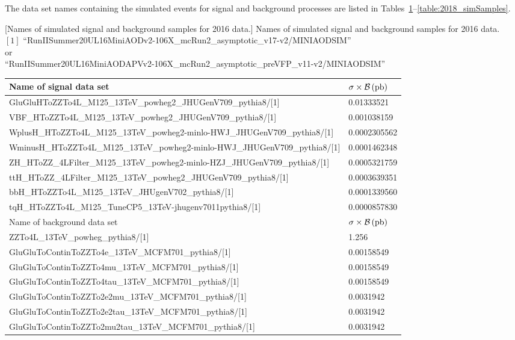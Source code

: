 The data set names containing the simulated events for signal and background processes are listed in Tables~\ref{table:2016_simSamples}--\ref{table:2018_simSamples}.
\begin{table}[h]
    \small
        [Names of simulated signal and background samples for 2016 data.]
        {Names of simulated signal and background samples for 2016 data. \\
        $[1]$ ``RunIISummer20UL16MiniAODv2-106X\_mcRun2\_asymptotic\_v17-v2/MINIAODSIM''
        \\
        or
        \\
        ``RunIISummer20UL16MiniAODAPVv2-106X\_mcRun2\_asymptotic\_preVFP\_v11-v2/MINIAODSIM''}
	\begin{tabular}{|ll|}
		\hline      
        Name of signal data set & $\sigma \times \mathcal{B}\,(\text{pb})$ \\
        \hline
		GluGluHToZZTo4L\_M125\_13TeV\_powheg2\_JHUGenV709\_pythia8/[1]	&	0.01333521	\\
		VBF\_HToZZTo4L\_M125\_13TeV\_powheg2\_JHUGenV709\_pythia8/[1]	&	0.001038159	\\
		WplusH\_HToZZTo4L\_M125\_13TeV\_powheg2-minlo-HWJ\_JHUGenV709\_pythia8/[1]	&	0.0002305562	\\
		WminusH\_HToZZTo4L\_M125\_13TeV\_powheg2-minlo-HWJ\_JHUGenV709\_pythia8/[1]	&	0.0001462348	\\
		ZH\_HToZZ\_4LFilter\_M125\_13TeV\_powheg2-minlo-HZJ\_JHUGenV709\_pythia8/[1]	&	0.0005321759	\\
		ttH\_HToZZ\_4LFilter\_M125\_13TeV\_powheg2\_JHUGenV709\_pythia8/[1]	&	0.0003639351	\\
		bbH\_HToZZTo4L\_M125\_13TeV\_JHUgenV702\_pythia8/[1]	&	0.0001339560	\\
		tqH\_HToZZTo4L\_M125\_TuneCP5\_13TeV-jhugenv7011\-pythia8/[1]	&	0.0000857830	\\
		\hline	
		\hline	
        Name of background data set & $\sigma \times \mathcal{B}\,(\text{pb})$ \\
		\hline	
		ZZTo4L\_13TeV\_powheg\_pythia8/[1]	&	1.256	\\
		GluGluToContinToZZTo4e\_13TeV\_MCFM701\_pythia8/[1]	&	0.00158549	\\
		GluGluToContinToZZTo4mu\_13TeV\_MCFM701\_pythia8/[1]	&	0.00158549	\\
		GluGluToContinToZZTo4tau\_13TeV\_MCFM701\_pythia8/[1]	&	0.00158549	\\
		GluGluToContinToZZTo2e2mu\_13TeV\_MCFM701\_pythia8/[1]	&	0.0031942	\\
		GluGluToContinToZZTo2e2tau\_13TeV\_MCFM701\_pythia8/[1]	&	0.0031942	\\
		GluGluToContinToZZTo2mu2tau\_13TeV\_MCFM701\_pythia8/[1]	&	0.0031942	\\
        \hline
        \end{tabular}
    \label{table:2016_simSamples}
\end{table}
